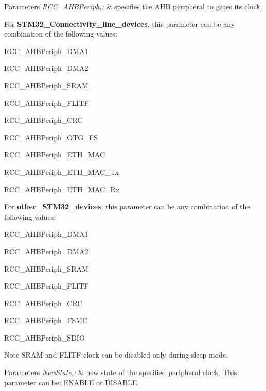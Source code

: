 \begin{DoxyParams}{Parameters}
{\em R\-C\-C\-\_\-\-A\-H\-B\-Periph,\-:} & specifies the A\-H\-B peripheral to gates its clock.\\
\hline
\end{DoxyParams}
For {\bfseries S\-T\-M32\-\_\-\-Connectivity\-\_\-line\-\_\-devices}, this parameter can be any combination of the following values\-: \begin{DoxyItemize}
\item R\-C\-C\-\_\-\-A\-H\-B\-Periph\-\_\-\-D\-M\-A1 \item R\-C\-C\-\_\-\-A\-H\-B\-Periph\-\_\-\-D\-M\-A2 \item R\-C\-C\-\_\-\-A\-H\-B\-Periph\-\_\-\-S\-R\-A\-M \item R\-C\-C\-\_\-\-A\-H\-B\-Periph\-\_\-\-F\-L\-I\-T\-F \item R\-C\-C\-\_\-\-A\-H\-B\-Periph\-\_\-\-C\-R\-C \item R\-C\-C\-\_\-\-A\-H\-B\-Periph\-\_\-\-O\-T\-G\-\_\-\-F\-S \item R\-C\-C\-\_\-\-A\-H\-B\-Periph\-\_\-\-E\-T\-H\-\_\-\-M\-A\-C \item R\-C\-C\-\_\-\-A\-H\-B\-Periph\-\_\-\-E\-T\-H\-\_\-\-M\-A\-C\-\_\-\-Tx \item R\-C\-C\-\_\-\-A\-H\-B\-Periph\-\_\-\-E\-T\-H\-\_\-\-M\-A\-C\-\_\-\-Rx\end{DoxyItemize}
For {\bfseries other\-\_\-\-S\-T\-M32\-\_\-devices}, this parameter can be any combination of the following values\-: \begin{DoxyItemize}
\item R\-C\-C\-\_\-\-A\-H\-B\-Periph\-\_\-\-D\-M\-A1 \item R\-C\-C\-\_\-\-A\-H\-B\-Periph\-\_\-\-D\-M\-A2 \item R\-C\-C\-\_\-\-A\-H\-B\-Periph\-\_\-\-S\-R\-A\-M \item R\-C\-C\-\_\-\-A\-H\-B\-Periph\-\_\-\-F\-L\-I\-T\-F \item R\-C\-C\-\_\-\-A\-H\-B\-Periph\-\_\-\-C\-R\-C \item R\-C\-C\-\_\-\-A\-H\-B\-Periph\-\_\-\-F\-S\-M\-C \item R\-C\-C\-\_\-\-A\-H\-B\-Periph\-\_\-\-S\-D\-I\-O\end{DoxyItemize}
\begin{DoxyNote}{Note}
S\-R\-A\-M and F\-L\-I\-T\-F clock can be disabled only during sleep mode. 
\end{DoxyNote}

\begin{DoxyParams}{Parameters}
{\em New\-State,\-:} & new state of the specified peripheral clock. This parameter can be\-: E\-N\-A\-B\-L\-E or D\-I\-S\-A\-B\-L\-E. \\
\hline
\end{DoxyParams}

